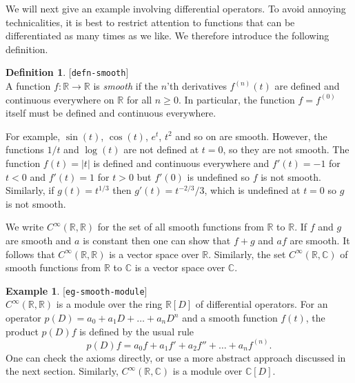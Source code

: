 \documentclass{amsart}
\newcommand{\lbl}[1]{\label{#1}\textup{[\texttt{#1}]}\ \\}
\newcommand{\lbl}{\label}
\newcommand{\C}         {{\mathbb{C}}}
\newcommand{\R}         {{\mathbb{R}}}
\newcommand{\CRR}       {C^\infty(\R,\R)}
\newcommand{\CRC}       {C^\infty(\R,\C)}
\newcommand{\xra}       {\xrightarrow}
\renewcommand{\:}{\colon}
\theoremstyle{definition}
\newtheorem{definition}[theorem]{Definition}
\newtheorem{example}[theorem]{Example}
\begin{document}
We will next give an example involving differential operators.
To avoid annoying technicalities, it is best to restrict attention to
functions that can be differentiated as many times as we like.  We
therefore introduce the following definition.
\begin{definition}\lbl{defn-smooth}
 A function $f\:\R\xra{}\R$ is \emph{smooth} if the $n$'th derivatives
 $f^{(n)}(t)$ are defined and continuous everywhere on $\R$ for all
 $n\geq 0$.  In particular, the function $f=f^{(0)}$ itself must be
 defined and continuous everywhere.  

 For example, $\sin(t)$, $\cos(t)$, $e^t$, $t^2$ and so on are smooth.
 However, the functions $1/t$ and $\log(t)$ are not defined at $t=0$,
 so they are not smooth.  The function $f(t)=|t|$ is defined and
 continuous everywhere and $f'(t)=-1$ for $t<0$ and $f'(t)=1$ for
 $t>0$ but $f'(0)$ is undefined so $f$ is not smooth.  Similarly, if
 $g(t)=t^{1/3}$ then $g'(t)=t^{-2/3}/3$, which is undefined at $t=0$
 so $g$ is not smooth.

 We write $\CRR$ for the set of all smooth functions from $\R$
 to $\R$.  If $f$ and $g$ are smooth and $a$ is constant then one can
 show that $f+g$ and $af$ are smooth.  It follows that $\CRR$
 is a vector space over $\R$.  Similarly, the set $\CRC$ of
 smooth functions from $\R$ to $\C$ is a vector space over $\C$.
\end{definition}
\begin{example}\lbl{eg-smooth-module}
 $\CRR$ is a module over the ring $\R[D]$ of differential operators.
 For an operator $p(D)=a_0+a_1D+\ldots+a_nD^n$ and a smooth function
 $f(t)$, the product $p(D)f$ is defined by the usual rule
 \[ p(D)f = a_0f + a_1 f' + a_2f'' + \ldots + a_nf^{(n)}. \]
 One can check the axioms directly, or use a more abstract approach
 discussed in the next section.  Similarly, $\CRC$ is a module over
 $\C[D]$. 
\end{example}
\end{document}
